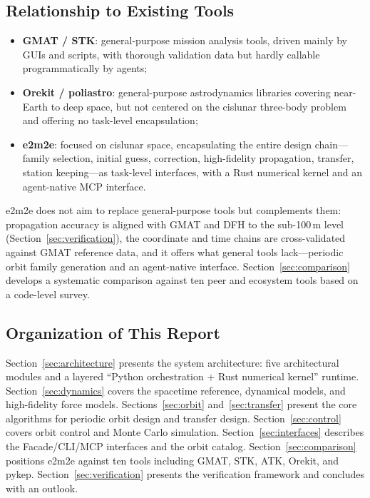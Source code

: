 \subsection{Relationship to Existing Tools}

\begin{itemize}
  \item \textbf{GMAT / STK}: general-purpose mission analysis tools, driven
        mainly by GUIs and scripts, with thorough validation data but hardly
        callable programmatically by agents;
  \item \textbf{Orekit / poliastro}: general-purpose astrodynamics libraries
        covering near-Earth to deep space, but not centered on the cislunar
        three-body problem and offering no task-level encapsulation;
  \item \textbf{e2m2e}: focused on cislunar space, encapsulating the entire
        design chain---family selection, initial guess, correction,
        high-fidelity propagation, transfer, station keeping---as task-level
        interfaces, with a Rust numerical kernel and an agent-native MCP
        interface.
\end{itemize}

e2m2e does not aim to replace general-purpose tools but complements them:
propagation accuracy is aligned with GMAT and DFH to the sub-100\,m level
(Section~\ref{sec:verification}), the coordinate and time chains are
cross-validated against GMAT reference data, and it offers what general tools
lack---periodic orbit family generation and an agent-native interface.
Section~\ref{sec:comparison} develops a systematic comparison against ten
peer and ecosystem tools based on a code-level survey.

\subsection{Organization of This Report}

Section~\ref{sec:architecture} presents the system architecture: five
architectural modules and a layered ``Python orchestration + Rust numerical
kernel'' runtime. Section~\ref{sec:dynamics} covers the spacetime reference,
dynamical models, and high-fidelity force models.
Sections~\ref{sec:orbit} and~\ref{sec:transfer} present the core algorithms
for periodic orbit design and transfer design. Section~\ref{sec:control}
covers orbit control and Monte Carlo simulation. Section~\ref{sec:interfaces}
describes the Facade/CLI/MCP interfaces and the orbit catalog.
Section~\ref{sec:comparison} positions e2m2e against ten tools including
GMAT, STK, ATK, Orekit, and pykep.
Section~\ref{sec:verification} presents the verification framework and
concludes with an outlook.
